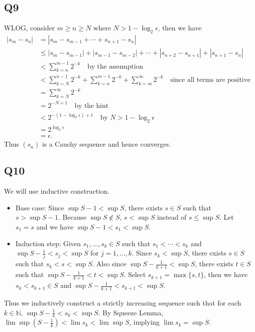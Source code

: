 \documentclass[12pt,lettersize]{article}
\theoremstyle{remark}
\newcommand{\N}{\mathbb{N}}
\begin{document}
\subsection*{Q9}
WLOG, consider $m\geq n\geq N$ where $N>1-\log_2\epsilon$, then we have
\begin{align*}
	|s_m-s_n| &= |s_m-s_{m-1}+\cdots+s_{n+1}-s_n|\\
			  &\leq |s_m-s_{m-1}|+|s_{m-1}-s_{m-2}|+\cdots+|s_{n+2}-s_{n+1}|+|s_{n+1}-s_n|\\
			  &< \sum_{k=n}^{m-1}2^{-k}\quad\text{by the assumption}\\
			  &< \sum_{k=N}^{n-1}2^{-k}+\sum_{k=n}^{m-1}2^{-k}+\sum_{k=m}^{\infty}2^{-k}\quad\text{since all terms are positive}\\
			  &= \sum_{k=N}^{\infty}2^{-k}\\
			  &= 2^{-N+1}\quad\text{by the hint}\\
			  &< 2^{-(1-\log_2\epsilon)+1}\quad\text{by $N>1-\log_2\epsilon$}\\
			  &= 2^{\log_2\epsilon}\\
			  &= \epsilon.
\end{align*}
Thus $(s_n)$ is a Cauchy sequence and hence converges.
\newpage

\subsection*{Q10}

We will use inductive construction.
\begin{itemize}
	\item Base case: Since $\sup S-1<\sup S$, there exists $s\in S$ such that $s>\sup S-1$. Because $\sup S\notin S$, $s<\sup S$ instead of $s\leq\sup S$. Let $s_1=s$ and we have $\sup S-1<s_1<\sup S$.
	\item Induction step: Given $s_1,\dots,s_k\in S$ such that $s_1<\cdots<s_k$ and $\sup S-\frac{1}{j}<s_j<\sup S$ for $j=1,\dots,k$. Since $s_k<\sup S$, there exists $s\in S$ such that $s_k<s<\sup S$. Also since $\sup S-\frac{1}{k+1}<\sup S$, there exists $t\in S$ such that $\sup S-\frac{1}{k+1}<t<\sup S$. Select $s_{k+1}=\max\{s,t\}$, then we have $s_k<s_{k+1}\in S$ and $\sup S-\frac{1}{k+1}<s_{k+1}<\sup S$.
\end{itemize}
Thus we inductively construct a strictly increasing sequence such that for each $k\in\N$, $\sup S-\frac{1}{k}<s_k<\sup S$. By Squeeze Lemma, $\lim\sup(S-\frac{1}{k})<\lim s_k<\lim\sup S$, implying $\lim s_k=\sup S$. 

\newpage
\end{document}
